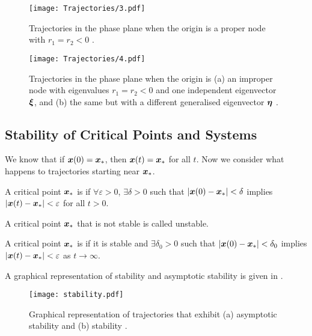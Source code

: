 \begin{figure}[H]
	\centering
	\texttt{[image: Trajectories/3.pdf]}
	\caption{Trajectories in the phase plane when the origin is a proper node with $r_1 = r_2 < 0$ \cite[Figure 9.1.3(a)]{boyce}.}
	\label{fig:trajectory3}
\end{figure}

\begin{figure}[H]
	\centering
	\texttt{[image: Trajectories/4.pdf]}
	\caption{Trajectories in the phase plane when the origin is (a) an improper node with eigenvalues $r_1 = r_2 < 0$ and one independent eigenvector $\bm{\xi}$, and (b) the same but with a different generalised eigenvector $\bm{\eta}$ \cite[Figure 9.1.4]{boyce}.}
	\label{fig:trajectory4}
\end{figure}

\subsection{Stability of Critical Points and Systems}

We know that if $\bm{x}(0) = \bm{x}_{\ast}$, then $\bm{x}(t) = \bm{x}_{\ast}$ for all $t$. Now we consider what happens to trajectories starting near $\bm{x}_{\ast}$.

\begin{definition}
	A critical point $\bm{x}_{\ast}$ is  if $\forall \varepsilon>0$, $\exists \delta>0$ such that $|\bm{x}(0) - \bm{x}_{\ast}| < \delta$ implies $|\bm{x}(t) - \bm{x}_{\ast}|<\varepsilon$ for all $t>0$.
\end{definition}

\begin{definition}
	A critical point $\bm{x}_{\ast}$ that is not stable is called unstable.
\end{definition}

\begin{definition}
	A critical point $\bm{x}_{\ast}$ is  if it is stable and $\exists \delta_0 >0$ such that $|\bm{x}(0) - \bm{x}_{\ast}| < \delta_0$ implies $|\bm{x}(t) - \bm{x}_{\ast}|<\varepsilon$ as $t \to \infty$.
\end{definition}

A graphical representation of stability and asymptotic stability is given in .

\begin{figure}[!ht]
	\centering
	\texttt{[image: stability.pdf]}
	\caption{Graphical representation of trajectories that exhibit (a) asymptotic stability and (b) stability \cite[Figure 9.2.1]{boyce}.}
	\label{fig:stability}
\end{figure}

